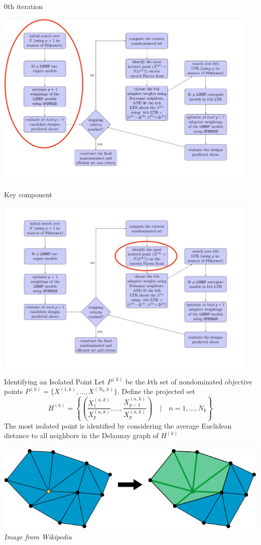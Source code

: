 \documentclass[xcolor=dvipsnames]{beamer}
\begin{document}
\begin{frame}{0th iteration}
\begin{center}
\includegraphics[width=0.95\textwidth]{0thit-chart.png}
\end{center}
\end{frame}
\begin{frame}{Key component}
\begin{center}
\includegraphics[width=0.95\textwidth]{isolated-chart.png}
\end{center}
\end{frame}
\begin{frame}{Identifying an Isolated Point}
Let $P^{(k)}$ be the $k$th set of nondominated objective points
$P^{(k)} = \{X^{(1,k)}, \ldots, X^{(N_k,k)}\} $.
\medskip
Define the projected set 
$$
H^{(k)} = \left\{ \left(\frac{X^{(n,k)}_1}{X^{(n,k)}_p}, \ldots,
\frac{X^{(n,k)}_{p-1}}{X^{(n,k)}_p}\right) \quad\bigg|\quad
n = 1, \ldots, N_k\right\}
$$
The most isolated point is identified by considering the average
Euclidean distance to all neighbors in the Delaunay graph of $H^{(k)}$\\
\begin{center}
\includegraphics[width=.5\textwidth]{del-nbhd.png}\\
{\it Image from Wikipedia}
\end{center}
\end{frame}
\end{document}
